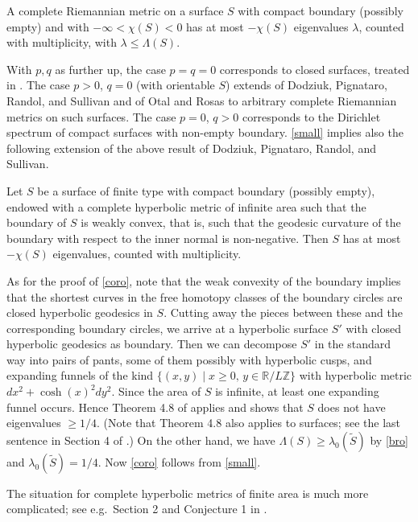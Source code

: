 \begin{thm}\label{small}
A complete Riemannian metric on a surface $S$ with compact boundary (possibly empty)
and with $-\infty<\chi(S)<0$ has at most $-\chi(S)$ eigenvalues $\lambda$,
counted with multiplicity, with $\lambda\le\Lambda(S)$.
\end{thm}

With $p,q$ as further up,
the case $p=q=0$ corresponds to closed surfaces, treated in \cite{BMM}.
The case $p>0$, $q=0$ (with orientable $S$)
extends \cite[Corollary 1.3]{DPRS} of Dodziuk, Pignataro,
Randol, and Sullivan and \cite[Th\'eor\`eme 2]{OR} of Otal and Rosas
to arbitrary complete Riemannian metrics on such surfaces.
The case $p=0$, $q>0$ corresponds to the Dirichlet spectrum
of compact surfaces with non-empty boundary.
\cref{small} implies also the following extension of the above result
of Dodziuk, Pignataro, Randol, and Sullivan.

\begin{cor}\label{coro}
Let $S$ be a surface of finite type with compact boundary (possibly empty),
endowed with a complete hyperbolic metric of infinite area
such that the boundary of $S$ is weakly convex, that is,
such that the geodesic curvature of the boundary
with respect to the inner normal is non-negative.
Then $S$ has at most $-\chi(S)$ eigenvalues,
counted with multiplicity.
\end{cor}

As for the proof of \cref{coro},
note that the weak convexity of the boundary implies that the shortest curves
in the free homotopy classes of the boundary circles
are closed hyperbolic geodesics in $S$.
Cutting away the pieces between these and the corresponding boundary circles,
we arrive at a hyperbolic surface $S'$ with closed hyperbolic geodesics as boundary.
Then we can decompose $S'$ in the standard way into pairs of pants,
some of them possibly with hyperbolic cusps, and expanding funnels of the kind
$\{(x,y)\mid x\ge0,\,y\in{\mathbb R}/L{\mathbb Z}\}$ with hyperbolic metric $dx^2+\cosh(x)^2dy^2$.
Since the area of $S$ is infinite, at least one expanding funnel occurs.
Hence Theorem 4.8 of \cite{LP} applies and shows that $S$ does not have
eigenvalues $\ge1/4$.
(Note that Theorem 4.8 also applies to surfaces;
see the last sentence in Section 4 of \cite{LP}.)
On the other hand, we have $\Lambda(S)\ge\lambda_0(\tilde S)$
by \eqref{bro} and $\lambda_0(\tilde S)=1/4$.
Now \cref{coro} follows from \cref{small}.

The situation for complete hyperbolic metrics of finite area
is much more complicated;
see e.g.\ Section 2 and Conjecture 1 in \cite{Sa}.

